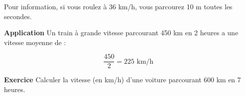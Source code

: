Pour information, si vous roulez à 36 km/h, vous parcourez 10 m toutes les secondes.

\vspace{0.3cm}
\textbf{Application}
\vspace{0.3cm}
Un train à grande vitesse parcourant 450 km en 2 heures a une vitesse moyenne de :

\vspace{0.3cm}
\begin{equation}
\frac{450}{2}  = 225 \text{ km/h}
\end{equation}

\vspace{0.3cm}
\textbf{Exercice}
\vspace{0.3cm}
Calculer la vitesse (en km/h) d'une voiture parcourant 600 km en 7 heures.


